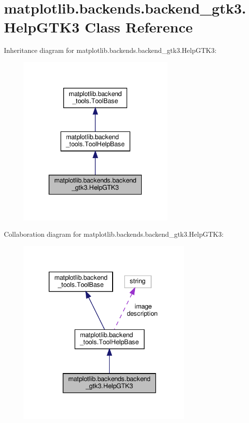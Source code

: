 \hypertarget{classmatplotlib_1_1backends_1_1backend__gtk3_1_1HelpGTK3}{}\section{matplotlib.\+backends.\+backend\+\_\+gtk3.\+Help\+G\+T\+K3 Class Reference}
\label{classmatplotlib_1_1backends_1_1backend__gtk3_1_1HelpGTK3}


Inheritance diagram for matplotlib.\+backends.\+backend\+\_\+gtk3.\+Help\+G\+T\+K3\+:
\nopagebreak
\begin{figure}[H]
\begin{center}
\leavevmode
\includegraphics[width=223pt]{classmatplotlib_1_1backends_1_1backend__gtk3_1_1HelpGTK3__inherit__graph}
\end{center}
\end{figure}


Collaboration diagram for matplotlib.\+backends.\+backend\+\_\+gtk3.\+Help\+G\+T\+K3\+:
\nopagebreak
\begin{figure}[H]
\begin{center}
\leavevmode
\includegraphics[width=248pt]{classmatplotlib_1_1backends_1_1backend__gtk3_1_1HelpGTK3__coll__graph}
\end{center}
\end{figure}
